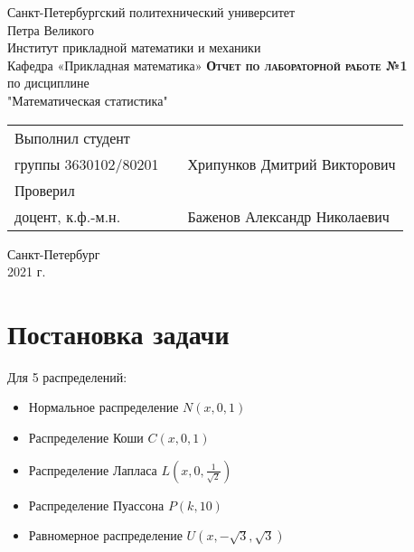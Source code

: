\documentclass[12pt,a4paper]{article}
\begin{document}
    \begin{titlepage}
        \begin{center}
            \large
            Санкт-Петербургский политехнический университет\\Петра Великого\\
            \vspace{0.5cm}
            Институт прикладной математики и механики\\
            \vspace{0.25cm}
            Кафедра «Прикладная математика»
            \vfill
            \textsc{\LARGE\textbf{Отчет по лабораторной работе №1}}\\[5mm]
            \Large
            по дисциплине\\"Математическая статистика"
        \end{center}
        \vfill
        \begin{tabular}{l p{175pt} l}
            Выполнил студент \\ группы 3630102/80201 && Хрипунков Дмитрий Викторович
            \vspace{0.25cm}
            \\Проверил \\ доцент, к.ф.-м.н. && Баженов Александр Николаевич
        \end{tabular}
        \vfill
        \begin{center}
            Санкт-Петербург \\ 2021 г.
        \end{center}
    \end{titlepage}

\newpage
\begin{center}
    \tableofcontents
    \setcounter{page}{2}
\end{center}
\newpage
\begin{center}
    \listoffigures
\end{center}

\newpage
\section{Постановка задачи}
Для 5 распределений:
\begin{itemize}
    \item Нормальное распределение $N(x,0,1)$
    \item Распределение Коши $C(x,0,1)$
    \item Распределение Лапласа $L(x,0,\frac{1}{\sqrt{2}})$
    \item Распределение Пуассона $P(k,10)$
    \item Равномерное распределение $U(x,-\sqrt{3},\sqrt{3})$
\end{itemize}
\end{document}
